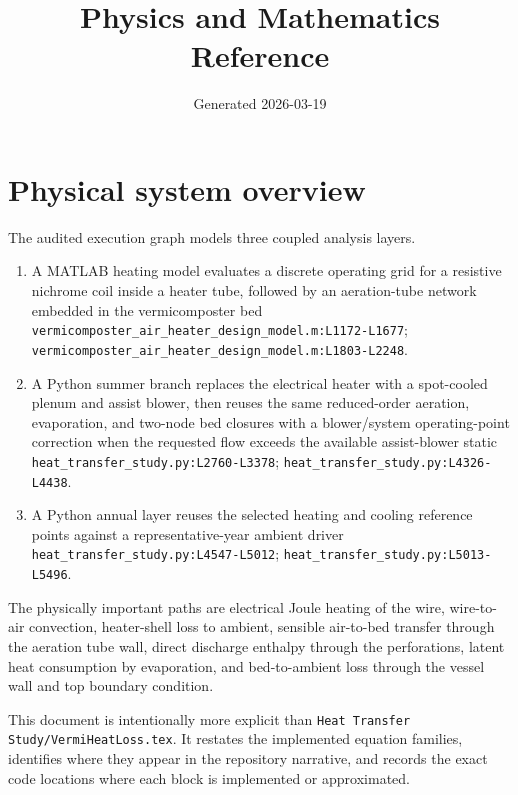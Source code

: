 \documentclass[11pt]{article}
\title{Physics and Mathematics Reference}
\date{Generated 2026-03-19}
\newcommand{\srcref}[1]{\nolinkurl{#1}}
\newcommand{\filepath}[1]{\nolinkurl{#1}}
\begin{document}
\maketitle

\section{Physical system overview}
The audited execution graph models three coupled analysis layers.

\begin{enumerate}[leftmargin=*]
\item A MATLAB heating model evaluates a discrete operating grid for a resistive nichrome coil inside a heater tube, followed by an aeration-tube network embedded in the vermicomposter bed \srcref{vermicomposter_air_heater_design_model.m:L1172-L1677}; \srcref{vermicomposter_air_heater_design_model.m:L1803-L2248}.
\item A Python summer branch replaces the electrical heater with a spot-cooled plenum and assist blower, then reuses the same reduced-order aeration, evaporation, and two-node bed closures with a blower/system operating-point correction when the requested flow exceeds the available assist-blower static \srcref{heat_transfer_study.py:L2760-L3378}; \srcref{heat_transfer_study.py:L4326-L4438}.
\item A Python annual layer reuses the selected heating and cooling reference points against a representative-year ambient driver \srcref{heat_transfer_study.py:L4547-L5012}; \srcref{heat_transfer_study.py:L5013-L5496}.
\end{enumerate}

The physically important paths are electrical Joule heating of the wire, wire-to-air convection, heater-shell loss to ambient, sensible air-to-bed transfer through the aeration tube wall, direct discharge enthalpy through the perforations, latent heat consumption by evaporation, and bed-to-ambient loss through the vessel wall and top boundary condition.

This document is intentionally more explicit than \filepath{Heat Transfer Study/VermiHeatLoss.tex}. It restates the implemented equation families, identifies where they appear in the repository narrative, and records the exact code locations where each block is implemented or approximated.
\end{document}
